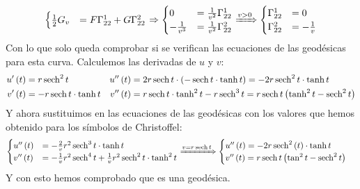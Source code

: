 \begin{align*}
\begin{cases}
        \frac{1}{2} G_v &= F \Gamma_{22}^1 + G \Gamma_{22}^2
    \end{cases} &\Rightarrow \begin{cases}
        0 &= \frac{1}{v^2} \Gamma_{22}^1\\
        -\frac{1}{v^3} &= \frac{1}{v^2} \Gamma_{22}^2
        \end{cases} \xRightarrow{v > 0} \begin{cases}
        \Gamma_{22}^1 &= 0\\
        \Gamma_{22}^2 &= -\frac{1}{v}
    \end{cases}\\
\end{align*}
Con lo que solo queda comprobar si se verifican las ecuaciones de las geodésicas
para esta curva. Calculemos las derivadas de $u$ y $v$:
\begin{align*}
    u'\left( t \right) &= r \operatorname{sech}^2 t & u''\left( t \right) &= 2 r
    \operatorname{sech} t \cdot \left( - \operatorname{sech} t \cdot \tanh t \right) = -2 r \operatorname{sech}^2 t \cdot
    \tanh t\\
    v'\left( t \right) &= -r \operatorname{sech} t \cdot \tanh t & v''\left( t \right) &= r
    \operatorname{sech} t \cdot \tanh^2 t - r \operatorname{sech}^3 t = r\operatorname{sech} t \left( \tanh^2 t - \operatorname{sech}^2
    t \right)
\end{align*}
Y ahora sustituimos en las ecuaciones de las geodésicas con los valores que
hemos obtenido para los símbolos de Christoffel:
\[
\begin{cases}
    u''\left( t \right) &= -\frac{2}{v}r^2 \operatorname{sech}^3 t \cdot \tanh t\\
    v''\left( t \right) &= -\frac{1}{v} r^2 \operatorname{sech}^4 t + \frac{1}{v} r^2 \operatorname{sech}^2 t
    \cdot \tanh^2 t
\end{cases} \xRightarrow{v = r \operatorname{sech}t} \begin{cases}
    u''\left( t \right) = -2 r \operatorname{sech}^2 \left( t \right) \cdot \tanh t\\
    v''\left( t \right) = r \operatorname{sech} t \left( \tan^2 t - \operatorname{sech}^2 t \right)
\end{cases}
\]
Y con esto hemos comprobado que es una geodésica.
